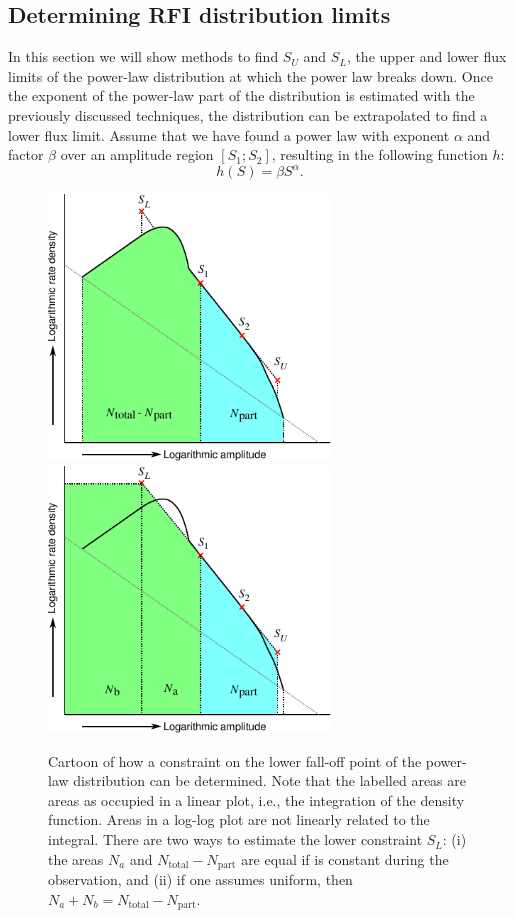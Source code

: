 \documentclass[useAMS,usenatbib]{mn2e}
\newcommand{\editmark}[1]{{\color{red}{\textbf{#1}}}}
\begin{document}
\subsection{Determining RFI distribution limits} \label{sec:rfi-distribution-constraints}
In this section we will show methods to find $S_U$ and $S_L$, the upper and lower flux limits of the power-law distribution at which the power law breaks down. Once the exponent of the power-law part of the distribution is estimated with the previously discussed techniques, the distribution can be extrapolated to find a lower flux limit. Assume that we have found a power law with exponent $\alpha$ and factor $\beta$ over an amplitude region $[S_1 ; S_2]$, resulting in the following \editmark{rate density} function $h$:
\begin{equation} \label{eq:amplitude-power-law}
h(S) = \beta S^\alpha.
\end{equation}
\begin{figure}
\begin{center}
\includegraphics[width=7.5cm]{img/explanation-lower-constraint/FindingCounts}
\includegraphics[width=7.5cm]{img/explanation-lower-constraint/FindingConstraints}
\caption{Cartoon of how a constraint on the lower fall-off point of the power-law distribution can be determined. Note that the labelled areas are areas as occupied in a linear plot, i.e., the integration of the density function. Areas in a log-log plot are not linearly related to the integral. There are two ways to estimate the lower constraint $S_L$: (i) the areas $N_a$ and $N_\textrm{total}-N_\textrm{part}$ are equal if \editmark{$Ig/r_L^\eta$} is constant during the observation, and (ii) if one assumes \editmark{$Ig/r_L^\eta\sim$} uniform, then $N_a+N_b = N_\textrm{total}-N_\textrm{part}$.}
\label{fig:explanation-constraints}
\end{center}
\end{figure}
\end{document}
